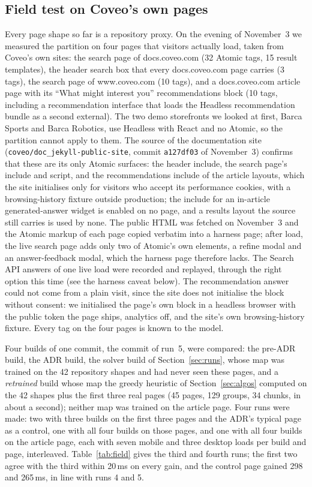 \documentclass[11pt]{article}
\newcommand{\code}[1]{\texttt{#1}}
\begin{document}
\subsection{Field test on Coveo's own pages}\label{sec:field}
Every page shape so far is a repository proxy. On the evening of November~3 we measured the partition on four pages that visitors actually load, taken from Coveo's own sites: the search page of docs.coveo.com (32 Atomic tags, 15 result templates), the header search box that every docs.coveo.com page carries (3 tags), the search page of www.coveo.com (10 tags), and a docs.coveo.com article page with its ``What might interest you'' recommendations block (10 tags, including a recommendation interface that loads the Headless recommendation bundle as a second external). The two demo storefronts we looked at first, Barca Sports and Barca Robotics, use Headless with React and no Atomic, so the partition cannot apply to them. The source of the documentation site (\code{coveo/doc\_jekyll-public-site}, commit \code{a127df03} of November~3) confirms that these are its only Atomic surfaces: the header include, the search page's include and script, and the recommendations include of the article layouts, which the site initialises only for visitors who accept its performance cookies, with a browsing-history fixture outside production; the include for an in-article generated-answer widget is enabled on no page, and a results layout the source still carries is used by none. The public HTML was fetched on November~3 and the Atomic markup of each page copied verbatim into a harness page; after load, the live search page adds only two of Atomic's own elements, a refine modal and an answer-feedback modal, which the harness page therefore lacks. The Search API answers of one live load were recorded and replayed, through the right option this time (see the harness caveat below). The recommendation answer could not come from a plain visit, since the site does not initialise the block without consent: we initialised the page's own block in a headless browser with the public token the page ships, analytics off, and the site's own browsing-history fixture. Every tag on the four pages is known to the model.

Four builds of one commit, the commit of run~5, were compared: the pre-ADR build, the ADR build, the solver build of Section~\ref{sec:runs}, whose map was trained on the 42 repository shapes and had never seen these pages, and a \emph{retrained} build whose map the greedy heuristic of Section~\ref{sec:algos} computed on the 42 shapes plus the first three real pages (45 pages, 129 groups, 34 chunks, in about a second); neither map was trained on the article page. Four runs were made: two with three builds on the first three pages and the ADR's typical page as a control, one with all four builds on those pages, and one with all four builds on the article page, each with seven mobile and three desktop loads per build and page, interleaved. Table~\ref{tab:field} gives the third and fourth runs; the first two agree with the third within 20\,ms on every gain, and the control page gained 298 and 265\,ms, in line with runs 4 and 5.
\end{document}
